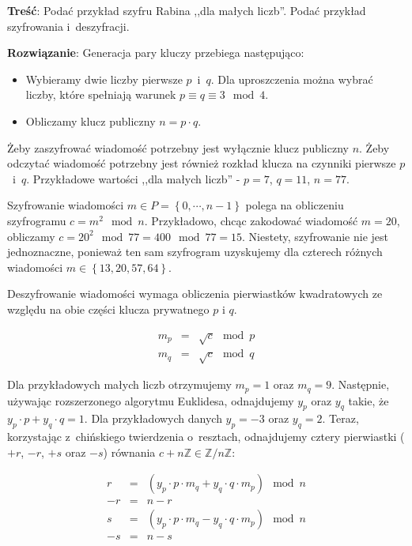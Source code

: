 \documentclass[a4paper,10pt, twocolumn]{article}
\begin{document}
\textbf{Treść}: Podać przykład szyfru Rabina ,,dla małych liczb''. Podać przykład szyfrowania i~deszyfracji.

\textbf{Rozwiązanie}: Generacja pary kluczy przebiega następująco:

\begin{itemize}
 \item Wybieramy dwie liczby pierwsze $p$~i~$q$. Dla uproszczenia można wybrać liczby, które spełniają warunek $p \equiv q \equiv 3 \mod 4$. 
 \item Obliczamy klucz publiczny $n = p \cdot q$.
\end{itemize}

\noindent Żeby zaszyfrować wiadomość potrzebny jest wyłącznie klucz publiczny $n$. Żeby odczytać wiadomość potrzebny jest również rozkład klucza na czynniki pierwsze $p$~i~$q$. Przykładowe wartości ,,dla małych liczb'' - $p = 7$, $q = 11$, $n = 77$.

\noindent Szyfrowanie wiadomości $m \in P = \left\{0, \cdots, n - 1 \right\}$ polega na obliczeniu szyfrogramu $c = m^{2} \mod n$. Przykładowo, chcąc zakodować wiadomość $m = 20$, obliczamy $c = 20^2 \mod 77 = 400 \mod 77 = 15$. Niestety, szyfrowanie nie jest jednoznaczne, ponieważ ten sam szyfrogram uzyskujemy dla czterech różnych wiadomości $m \in \left\{13, 20, 57, 64\right\}$.

\noindent Deszyfrowanie wiadomości wymaga obliczenia pierwiastków kwadratowych ze względu na obie części klucza prywatnego $p$ i $q$.

\begin{equation*}
 \begin{array}{lcl} m_{p} & = & \sqrt{c} \mod p \\ m_{q} & = & \sqrt{c} \mod q \end{array}
\end{equation*}

\noindent Dla przykładowych małych liczb otrzymujemy $m_{p} = 1$ oraz $m_{q} = 9$. Następnie, używając rozszerzonego algorytmu Euklidesa, odnajdujemy $y_{p}$ oraz $y_{q}$ takie, że $y_{p} \cdot p + y_{q} \cdot q = 1$. Dla przykładowych danych $y_{p} = -3$ oraz $y_{q} = 2$. Teraz, korzystając z~chińskiego twierdzenia o~resztach, odnajdujemy cztery pierwiastki ($+r$, $-r$, $+s$ oraz $-s$) równania $c + n\mathbb{Z} \in \mathbb{Z}/n\mathbb{Z}$:

\begin{equation*}
 \begin{array}{lcl} r & = & (y_{p} \cdot p \cdot m_{q} + y_{q} \cdot q \cdot m_{p}) \mod n \\ -r & = & n - r \\ s & = & (y_{p} \cdot p \cdot m_{q} - y_{q} \cdot q \cdot m_{p}) \mod n \\ -s & = & n - s \\ \end{array}
\end{equation*}
\end{document}
